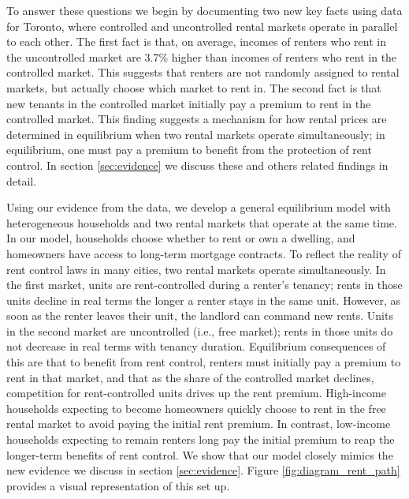 \documentclass[parskip=full]{article}
\begin{document}
To answer these questions we begin by documenting two new key facts using data for Toronto, where controlled and uncontrolled rental markets operate in parallel to each other. The first fact is that, on average, incomes of renters who rent in the uncontrolled market are 3.7\% higher than incomes of renters who rent in the controlled market. This suggests that renters are not randomly assigned to rental markets, but actually choose which market to rent in. The second fact is that new tenants in the controlled market initially pay a premium to rent in the controlled market. This finding suggests a mechanism for how rental prices are determined in equilibrium when two rental markets operate simultaneously; in equilibrium, one must pay a premium to benefit from the protection of rent control. In section \ref{sec:evidence} we discuss these and others related findings in detail. 

Using our evidence from the data, we develop a general equilibrium model with heterogeneous households and two rental markets that operate at the same time. In our model, households choose whether to rent or own a dwelling, and homeowners have access to long-term mortgage contracts. To reflect the reality of rent control laws in many cities, two rental markets operate simultaneously. In the first market, units are rent-controlled during a renter's tenancy; rents in those units decline in real terms the longer a renter stays in the same unit. However, as soon as the renter leaves their unit, the landlord can command new rents. Units in the second market are uncontrolled (i.e., free market); rents in those units do not decrease in real terms with tenancy duration. Equilibrium consequences of this are that to benefit from rent control, renters must initially pay a premium to rent in that market, and that as the share of the controlled market declines, competition for rent-controlled units drives up the rent premium. High-income households expecting to become homeowners quickly choose to rent in the free rental market to avoid paying the initial rent premium. In contrast, low-income households expecting to remain renters long pay the initial premium to reap the longer-term benefits of rent control. We show that our model closely mimics the new evidence we discuss in section \ref{sec:evidence}. Figure \ref{fig:diagram_rent_path} provides a visual representation of this set up.
\end{document}
